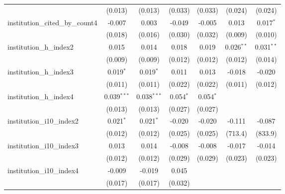 \begin{tabular}{lcccccc}
                                         & (0.013)        & (0.013)       & (0.033)        & (0.033)       & (0.024)       & (0.024)\\   
   institution\_cited\_by\_count4        & -0.007         & 0.003         & -0.049         & -0.005        & 0.013         & 0.017$^{*}$\\   
                                         & (0.018)        & (0.016)       & (0.030)        & (0.032)       & (0.009)       & (0.010)\\   
   institution\_h\_index2                & 0.015          & 0.014         & 0.018          & 0.019         & 0.026$^{**}$  & 0.031$^{**}$\\   
                                         & (0.009)        & (0.009)       & (0.012)        & (0.012)       & (0.012)       & (0.014)\\   
   institution\_h\_index3                & 0.019$^{*}$    & 0.019$^{*}$   & 0.011          & 0.013         & -0.018        & -0.020\\   
                                         & (0.011)        & (0.011)       & (0.022)        & (0.022)       & (0.011)       & (0.012)\\   
   institution\_h\_index4                & 0.039$^{***}$  & 0.038$^{***}$ & 0.054$^{*}$    & 0.054$^{*}$   &               &   \\   
                                         & (0.013)        & (0.013)       & (0.027)        & (0.027)       &               &   \\   
   institution\_i10\_index2              & 0.021$^{*}$    & 0.021$^{*}$   & -0.020         & -0.020        & -0.111        & -0.087\\   
                                         & (0.012)        & (0.012)       & (0.025)        & (0.025)       & (713.4)       & (833.9)\\   
   institution\_i10\_index3              & 0.013          & 0.014         & -0.008         & -0.008        & -0.017        & -0.014\\   
                                         & (0.012)        & (0.012)       & (0.029)        & (0.029)       & (0.023)       & (0.023)\\   
   institution\_i10\_index4              & -0.009         & -0.019        & 0.045          &               &               &   \\   
                                         & (0.017)        & (0.017)       & (0.032)        &               &               &   \\   

\end{tabular}
